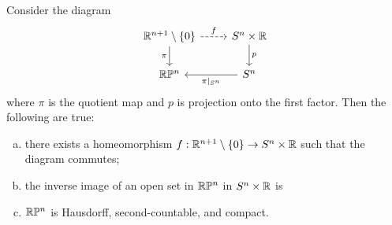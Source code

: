 \documentclass{../../mathnotes}
\begin{document}
\begin{prop}
    Consider the diagram
    \begin{equation*}
        \begin{tikzcd}
            \R^{n+1}\setminus\left\{ 0 \right\}\arrow[swap]{d}{\pi}\arrow[dashed]{r}{f} & S^n\times\R\arrow{d}{p}\\
            \RP^n & S^n\arrow{l}{\pi|_{S^n}}
        \end{tikzcd}
    \end{equation*}
    where $\pi$ is the quotient map and $p$ is projection onto the first factor. Then the following are true:
    \begin{enumerate}[(a)]
        \item there exists a homeomorphism $f:\mathbb{R}^{n+1}\setminus\left\{ 0 \right\}\to S^n\times\mathbb{R}$ such that the diagram commutes;
        \item the inverse image of an open set in $\mathbb{R}\mathbb{P}^n$ in $S^n\times\mathbb{R}$ is
        \item $\mathbb{R}\mathbb{P}^n$ is Hausdorff, second-countable, and compact.
    \end{enumerate}
\end{prop}
\end{document}
